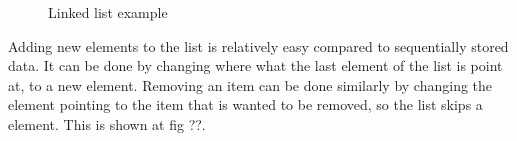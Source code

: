 \begin{figure}[h]
 \centering
{}
\caption{Linked list example} \label{fig:link}
\end{figure}

Adding new elements to the list is relatively easy compared to sequentially stored data.
It can be done by changing where what the last element of the list is point at, to a new element.
Removing an item can be done similarly by changing the element pointing to the item that is wanted to be removed, so the list skips a element. This is shown at fig ??. %






